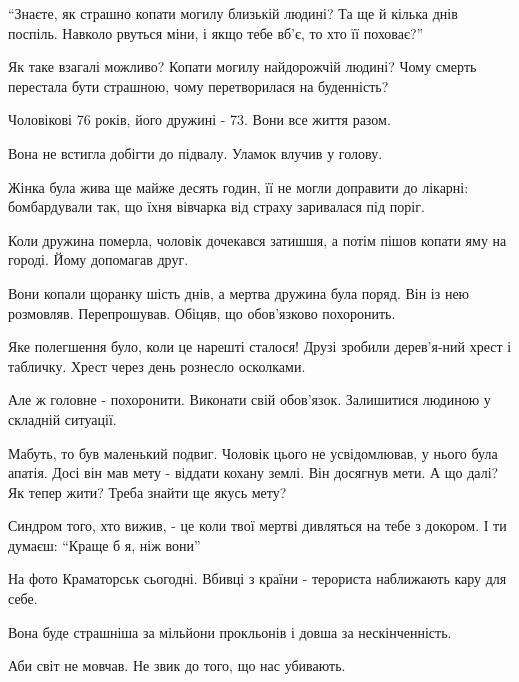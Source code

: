 \enquote{Знаєте, як страшно копати могилу близькій людині? Та ще й кілька днів поспіль.
Навколо рвуться міни, і якщо тебе вб'є, то хто її поховає?}

Як таке взагалі можливо? Копати могилу найдорожчій людині? Чому смерть
перестала бути страшною, чому перетворилася на буденність?

Чоловікові 76 років, його дружині  - 73. Вони все життя разом. 

Вона не встигла добігти до підвалу. Уламок влучив у голову. 

Жінка була жива ще майже десять годин, її не могли доправити до лікарні:
бомбардували так, що їхня вівчарка від страху заривалася під поріг. 

Коли дружина померла, чоловік дочекався затишшя, а потім пішов копати яму на
городі. Йому допомагав друг. 

Вони копали щоранку шість днів, а мертва дружина була поряд. Він із нею
розмовляв. Перепрошував. Обіцяв, що обов'язково похоронить.

Яке полегшення було, коли це нарешті сталося! Друзі зробили дерев'я\hyp ний хрест і
табличку. Хрест через день рознесло осколками. 

Але ж головне -  похоронити. Виконати свій обов'язок. Залишитися людиною у
складній ситуації.

Мабуть, то був маленький подвиг. Чоловік цього не усвідомлював, у нього була
апатія. Досі він мав мету -  віддати кохану землі. Він досягнув мети. А що
далі? Як тепер жити? Треба знайти ще якусь мету?

Синдром того, хто вижив, -  це коли твої мертві дивляться на тебе з докором. І
ти думаєш: \enquote{Краще б я, ніж вони}

На фото Краматорськ сьогодні.  Вбивці з країни - терориста наближають кару для
себе. 

Вона буде страшніша за мільйони прокльонів і довша за нескінченність.

Аби світ не мовчав. Не звик до того, що нас убивають.

